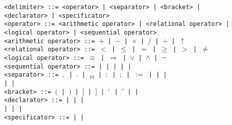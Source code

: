 \documentclass[a4paper,11pt]{article}
\begin{document}
\begin{flushleft}
\vspace{0.2em}\texttt{<delimiter> ::= <operator> | <separator> | <bracket> |\\
  \hspace{1cm}<declarator> | <specificator>}\\

\vspace{0.2em}\texttt{<operator> ::= <arithmetic operator> | <relational operator> |\\
  \hspace{1cm}<logical operator> | <sequential operator>}\\

\vspace{0.2em}\texttt{<arithmetic operator> ::= $+$ | $-$ | $\times$ | $/$ | $\div$ | $\uparrow$}\\

\vspace{0.2em}\texttt{<relational operator> ::= $<$ | $\leq$ | $=$ | $\geq$ | $>$ | $\neq$}\\

\vspace{0.2em}\texttt{<logical operator> ::= $\equiv$ | $\Rightarrow$ | $\vee$ | $\wedge$ | $\neg$}\\

\vspace{0.2em}\texttt{<sequential operator> ::=  |  |  |
   |  | \footnotemark}\\

\vspace{0.2em}\texttt{<separator> ::= $,$ | $.$ | $_{10}$ | $:$ | $;$ | $:=$ | \blankchar{} |  |\\
  \hspace{1cm} |  | }\\

\vspace{0.2em}\texttt{<bracket> ::= $($ | $)$ | $[$ | $]$ | $`$ | $'$ |  | }\\

\vspace{0.2em}\texttt{<declarator> ::=  |  |  |\\
  \hspace{1cm} |  |  | }\\

\vspace{0.2em}\texttt{<specificator> ::=  |  | }\\

\end{flushleft}
\end{document}
